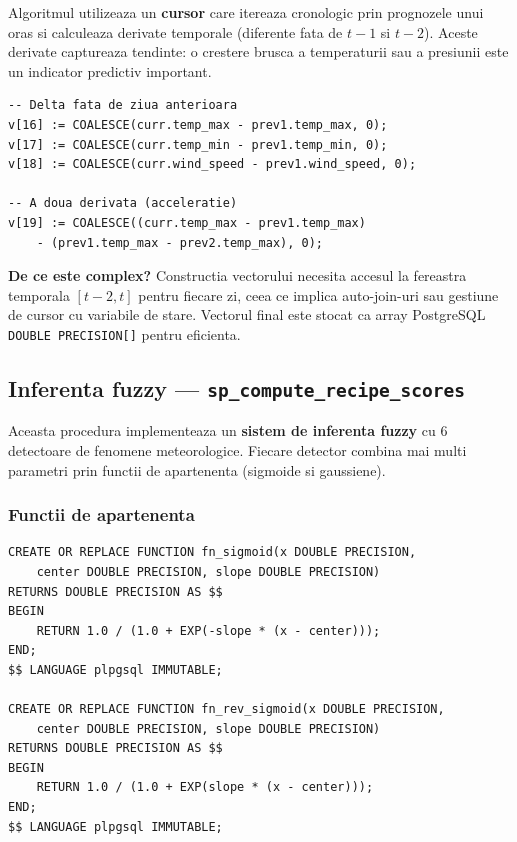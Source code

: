 \documentclass[12pt,a4paper]{article}
\begin{document}
Algoritmul utilizeaza un \textbf{cursor} care itereaza cronologic prin prognozele unui oras si calculeaza derivate temporale (diferente fata de $t-1$ si $t-2$). Aceste derivate captureaza tendinte: o crestere brusca a temperaturii sau a presiunii este un indicator predictiv important.

\begin{lstlisting}[caption={Fragment din vectorizare --- calculul derivatelor temporale}]
-- Delta fata de ziua anterioara
v[16] := COALESCE(curr.temp_max - prev1.temp_max, 0);
v[17] := COALESCE(curr.temp_min - prev1.temp_min, 0);
v[18] := COALESCE(curr.wind_speed - prev1.wind_speed, 0);

-- A doua derivata (acceleratie)
v[19] := COALESCE((curr.temp_max - prev1.temp_max)
    - (prev1.temp_max - prev2.temp_max), 0);
\end{lstlisting}

\textbf{De ce este complex?} Constructia vectorului necesita accesul la fereastra temporala $[t-2, t]$ pentru fiecare zi, ceea ce implica auto-join-uri sau gestiune de cursor cu variabile de stare. Vectorul final este stocat ca array PostgreSQL \texttt{DOUBLE PRECISION[]} pentru eficienta.

\subsection{Inferenta fuzzy --- \texttt{sp\_compute\_recipe\_scores}}

Aceasta procedura implementeaza un \textbf{sistem de inferenta fuzzy} cu 6 detectoare de fenomene meteorologice. Fiecare detector combina mai multi parametri prin functii de apartenenta (sigmoide si gaussiene).

\subsubsection{Functii de apartenenta}

\begin{lstlisting}[caption={Functii fuzzy implementate ca functii PostgreSQL}]
CREATE OR REPLACE FUNCTION fn_sigmoid(x DOUBLE PRECISION,
    center DOUBLE PRECISION, slope DOUBLE PRECISION)
RETURNS DOUBLE PRECISION AS $$
BEGIN
    RETURN 1.0 / (1.0 + EXP(-slope * (x - center)));
END;
$$ LANGUAGE plpgsql IMMUTABLE;

CREATE OR REPLACE FUNCTION fn_rev_sigmoid(x DOUBLE PRECISION,
    center DOUBLE PRECISION, slope DOUBLE PRECISION)
RETURNS DOUBLE PRECISION AS $$
BEGIN
    RETURN 1.0 / (1.0 + EXP(slope * (x - center)));
END;
$$ LANGUAGE plpgsql IMMUTABLE;
\end{lstlisting}
\end{document}
